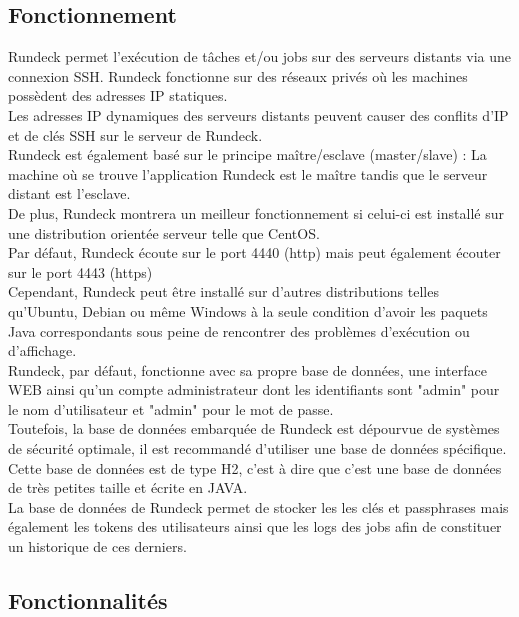 \documentclass[12pt]{article}
\begin{document}
\subsection{Fonctionnement}

Rundeck permet l'exécution de tâches et/ou jobs sur des serveurs distants via une connexion SSH. Rundeck fonctionne sur des réseaux privés où les machines possèdent des adresses IP statiques. 
\\
Les adresses IP dynamiques des serveurs distants peuvent causer des conflits d'IP et de clés SSH sur le serveur de Rundeck.
\\
Rundeck est également basé sur le principe maître/esclave (master/slave) : La machine où se trouve l'application Rundeck est le maître tandis que le serveur distant est l'esclave. 
\\
De plus, Rundeck montrera un meilleur fonctionnement si celui-ci est installé sur une distribution orientée serveur telle que CentOS. 
\\
Par défaut, Rundeck écoute sur le port 4440 (http) mais peut également écouter sur le port 4443 (https)
\\
Cependant, Rundeck peut être installé sur d'autres distributions telles qu'Ubuntu, Debian ou même Windows à la seule condition d'avoir les paquets Java correspondants sous peine de rencontrer des problèmes d'exécution ou d'affichage.
\\
Rundeck, par défaut, fonctionne avec sa propre base de données, une interface WEB ainsi qu'un compte administrateur dont les identifiants sont "admin" pour le nom d'utilisateur et "admin" pour le mot de passe.
\\
Toutefois, la base de données embarquée de Rundeck est dépourvue de systèmes de sécurité optimale, il est recommandé d'utiliser une base de données spécifique.
\\
Cette base de données est de type H2, c'est à dire que c'est une base de données de très petites taille et écrite en JAVA.
\\
La base de données de Rundeck permet de stocker les les clés et passphrases mais également les tokens des utilisateurs ainsi que les logs des jobs afin de constituer un historique de ces derniers.

\subsection{Fonctionnalités}
\end{document}
